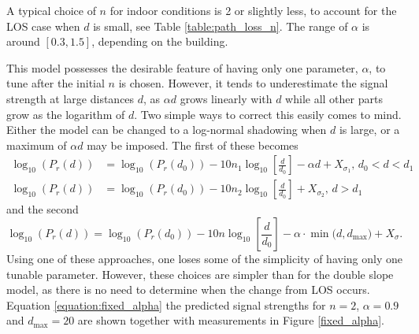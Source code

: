 \documentclass{LTHthesis}
\begin{document}
A typical choice of $n$ for indoor conditions is 2 or slightly less, to account for the LOS case when $d$ is small, see Table \ref{table:path_loss_n}. The range of $\alpha$ is around $[0.3,1.5]$, depending on the building.

This model possesses the desirable feature of having only one parameter, $\alpha$, to tune after the initial $n$ is chosen. However, it tends to underestimate the signal strength at large distances $d$, as $\alpha d$ grows linearly with $d$ while all other parts grow as the logarithm of $d$. Two simple ways to correct this easily comes to mind. Either the model can be changed to a log-normal shadowing when $d$ is large, or a maximum of $\alpha d $ may be imposed. The first of these becomes
%
\begin{subequations}
\begin{align}
\log_{10}({P_r(d)})&=\log_{10}({P_r(d_0)})-10n_1\log_{10}\left[{\frac{d}{d_0}}\right] -\alpha d+ X_{\sigma_1}, \hspace{2pt} d_0<d<d_1\\
\log_{10}({P_r(d)})&=\log_{10}({P_r(d_0)})-10n_2\log_{10}\left[{\frac{d}{d_0}}\right] + X_{\sigma_2}, \hspace{2pt} d>d_1
\end{align}
\end{subequations} 
and the second
\begin{equation}
\log_{10}({P_r(d)})=\log_{10}({P_r(d_0)})-10n\log_{10}\left[{\frac{d}{d_0}}\right] - \alpha\cdot\min({d, d_{\text{max}})}+ X_\sigma.
\label{equation:fixed_alpha}
\end{equation}
%
Using one of these approaches, one loses some of the simplicity of having only one tunable parameter. However, these choices are simpler than for the double slope model, as there is no need to determine when the change from LOS occurs. 
Equation \ref{equation:fixed_alpha} the predicted signal strengths for $n=2$, $\alpha=0.9$ and $d_{\text{max}}=20$ are shown together with measurements in Figure \ref{fixed_alpha}. 
\end{document}

